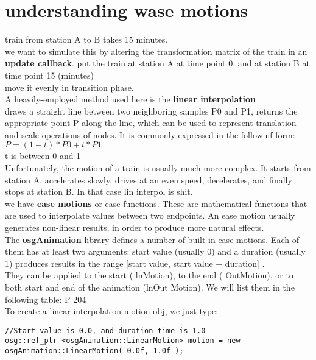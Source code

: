 \documentclass[a4paper,12pt]{book}
\begin{document}
\section{understanding wase motions}
train from station A to B takes 15 minutes.\\
we want to simulate this by altering the transformation matrix of the train in an \textbf{update callback}.
\textrightarrow put the train at station A at time point 0, and at station B at time point 15 (minutes) \\
\textrightarrow move it evenly in transition phase.\\
A heavily-employed method used here is the \textbf{linear interpolation} \\
\textrightarrow draws a straight line between two neighboring samples P0 and P1, returns the appropriate point P along the line, which can be used to represent translation and scale operations of nodes. It is commonly expressed in the followinf form:\\
$P = ( 1 - t ) * P0 + t * P1$\\
\textrightarrow t is between 0 and 1\\
Unfortunately, the motion of a train is usually much more complex. It starts from station A, accelerates slowly, drives at an even speed, decelerates, and finally stops at station B. In that case lin interpol is shit.\\

\textrightarrow we have \textbf{ease motions} or ease functions. These are mathematical functions that are used to interpolate values between two endpoints. An ease motion usually generates non-linear results, in order to produce more natural effects.\\
The \textbf{osgAnimation} library defines a number of built-in ease motions. Each of them has at least two arguments: start value (usually 0) and a duration (usually 1) \textrightarrow produces results in the range [start value, start value + duration] .\\
They can be applied to the start ( lnMotion), to the end ( OutMotion), or to both start and end of the animation (lnOut Motion). We will list them in the following table:
P 204\\

To create a linear interpolation motion obj, we just type:\\
\begin{lstlisting}
//Start value is 0.0, and duration time is 1.0
osg::ref_ptr <osgAnimation::LinearMotion> motion = new osgAnimation::LinearMotion( 0.0f, 1.0f );
\end{lstlisting}
\end{document}
